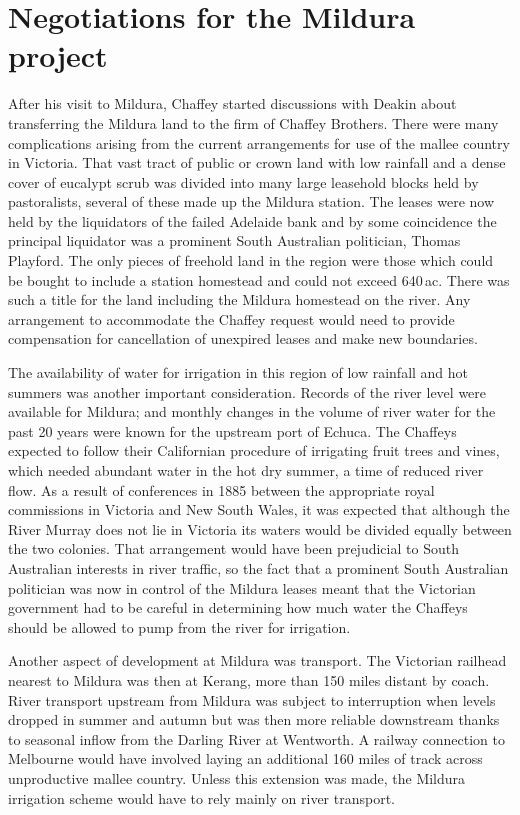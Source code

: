 \section{Negotiations for the Mildura project}

After his visit to Mildura, Chaffey started discussions with Deakin
about transferring the Mildura land to the firm of Chaffey Brothers.
There were many complications arising from the current arrangements
for use of the mallee country in Victoria.  That vast tract of public
or crown land with low rainfall and a dense cover of eucalypt scrub
was divided into many large leasehold blocks held by pastoralists,
several of these made up the Mildura station.  The leases were now
held by the liquidators of the failed Adelaide bank and by some
coincidence the principal liquidator was a prominent South Australian
politician, Thomas Playford.  The only pieces of freehold land in the
region were those which could be bought to include a station homestead
and could not exceed 640\,ac.  There was such a title for the land
including the Mildura homestead on the river.  Any arrangement to
accommodate the Chaffey request would need to provide compensation for
cancellation of unexpired leases and make new boundaries.

The availability of water for irrigation in this region of low
rainfall and hot summers was another important consideration. Records
of the river level were available for Mildura; and monthly changes in
the volume of river water for the past 20 years were known for the
upstream port of Echuca.  The Chaffeys expected to follow their
Californian procedure of irrigating fruit trees and vines, which
needed abundant water in the hot dry summer, a time of reduced river
flow.  As a result of conferences in 1885 between the appropriate
royal commissions in Victoria and New South Wales, it was expected
that although the River Murray does not lie in Victoria its waters
would be divided equally between the two colonies.  That arrangement
would have been prejudicial to South Australian interests in river
traffic, so the fact that a prominent South Australian politician was
now in control of the Mildura leases meant that the Victorian
government had to be careful in determining how much water the
Chaffeys should be allowed to pump from the river for irrigation.

Another aspect of development at Mildura was transport.  The Victorian
railhead nearest to Mildura was then at Kerang, more than 150 miles
distant by coach.  River transport upstream from Mildura was subject
to interruption when levels dropped in summer and autumn but was then
more reliable downstream thanks to seasonal inflow from the Darling
River at Wentworth.  A railway connection to Melbourne would have
involved laying an additional 160 miles of track across unproductive
mallee country.  Unless this extension was made, the Mildura
irrigation scheme would have to rely mainly on river transport.

